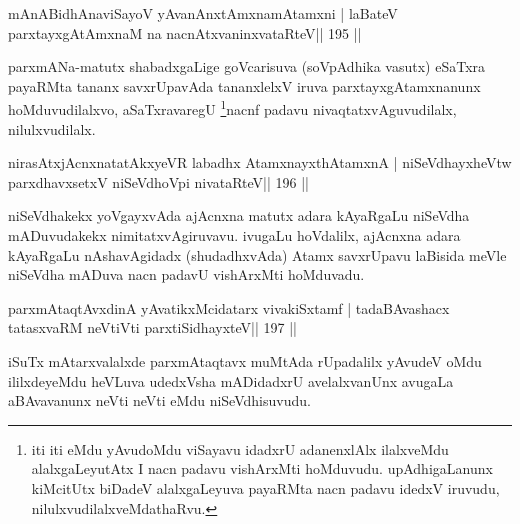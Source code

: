 
\begin{shl}
mAnABidhAnaviSayoV yAvanAnx\s\s tAmxnamAtamxni |
laBateV parxtayxgAtAmxnaM na nacnAtxvaninxvataRteV\hfill || 195 ||
\end{shl}

\begin{artha}
parxmANa-matutx shabadxgaLige goVcarisuva (soVpAdhika vasutx) eSaTxra
payaRMta tananx savxrUpavAda tananxlelxV iruva parxtayxgAtamxnanunx
hoMduvudilalxvo, aSaTxravaregU \footnote{iti iti eMdu yAvudoMdu
  viSayavu idadxrU adanenxlAlx ilalxveMdu alalxgaLeyutAtx I nacn
  padavu vishArxMti hoMduvudu. upAdhigaLanunx kiMcitUtx biDadeV
  alalxgaLeyuva payaRMta nacn padavu idedxV iruvudu,
  nilulxvudilalxveMdathaRvu.}nacnf padavu
nivaqtatxvAguvudilalx, nilulxvudilalx.
\end{artha}


\begin{shl}
nirasAtxjAcnxnatatAkxyeVR labadhx AtamxnayxthA\s\s tamxnA |
niSeVdhayxheVtw parxdhavxsetxV niSeVdhoV\s pi nivataRteV\hfill || 196 ||
\end{shl}

\begin{artha}
niSeVdhakekx yoVgayxvAda ajAcnxna matutx adara kAyaRgaLu niSeVdha
mADuvudakekx nimitatxvAgiruvavu. ivugaLu hoVdalilx, ajAcnxna adara
kAyaRgaLu nAshavAgidadx (shudadhxvAda) Atamx savxrUpavu laBisida meVle
niSeVdha mADuva nacn padavU vishArxMti hoMduvadu. 
\end{artha}


\begin{shl}
parxmAtaqtAvxdinA yAvatikxMcidatarx vivakiSxtamf |
tadaBAvashacx tatasxvaRM neVtiVti parxtiSidhayxteV\hfill || 197 ||
\end{shl}

\begin{artha}
iSuTx mAtarxvalalxde parxmAtaqtavx muMtAda rUpadalilx yAvudeV oMdu ililxdeyeMdu heVLuva udedxVsha mADidadxrU avelalxvanUnx avugaLa aBAvavanunx neVti neVti eMdu niSeVdhisuvudu.
\end{artha}


